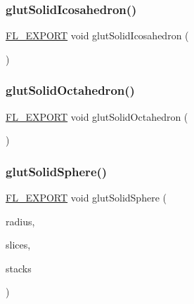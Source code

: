 \subsubsection{\texorpdfstring{glut\+Solid\+Icosahedron()}{glutSolidIcosahedron()}}
{\footnotesize\ttfamily \hyperlink{_fl___export_8_h_aa9ba29a18aee9d738370a06eeb4470fc}{F\+L\+\_\+\+E\+X\+P\+O\+RT} void glut\+Solid\+Icosahedron (\begin{DoxyParamCaption}{ }\end{DoxyParamCaption})}

\mbox{\label{glut_8_h_af8ad8d01f33a6a3df025c0da742cc8ad}} 
\subsubsection{\texorpdfstring{glut\+Solid\+Octahedron()}{glutSolidOctahedron()}}
{\footnotesize\ttfamily \hyperlink{_fl___export_8_h_aa9ba29a18aee9d738370a06eeb4470fc}{F\+L\+\_\+\+E\+X\+P\+O\+RT} void glut\+Solid\+Octahedron (\begin{DoxyParamCaption}{ }\end{DoxyParamCaption})}

\mbox{\label{glut_8_h_a717bd732ad899d0b41ee134ce559f184}} 
\subsubsection{\texorpdfstring{glut\+Solid\+Sphere()}{glutSolidSphere()}}
{\footnotesize\ttfamily \hyperlink{_fl___export_8_h_aa9ba29a18aee9d738370a06eeb4470fc}{F\+L\+\_\+\+E\+X\+P\+O\+RT} void glut\+Solid\+Sphere (\begin{DoxyParamCaption}\item[{G\+Ldouble}]{radius,  }\item[{G\+Lint}]{slices,  }\item[{G\+Lint}]{stacks }\end{DoxyParamCaption})}

\mbox{\label{glut_8_h_a692708aeb2365fc764832d3513f278f5}} 
